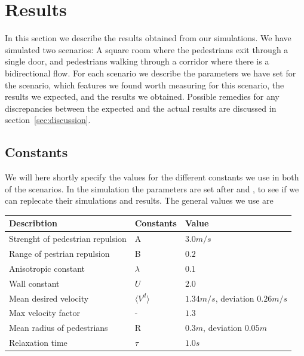 \section{Results}
\label{sec:results}
In this section we describe the results obtained from our simulations. We have simulated two scenarios: A square room where the pedestrians exit through a single door, and pedestrians walking through a corridor where there is a bidirectional flow. For each scenario we describe the parameters we have set for the scenario, which features we found worth measuring for this scenario, the results we expected, and the results we obtained. Possible remedies for any discrepancies between the expected and the actual results are discussed in section~\ref{sec:discussion}.

\subsection{Constants}
We will here shortly specify the values for the different constants we use in both of the scenarios.
In the simulation the parameters are set after \cite{ABconstant} and \cite{self-org}, to see if we can replecate their simulations and results.
The general values we use are

\begin{center}
\begin{table}[ht]
\begin{center}
    \begin{tabular}{ | l | l | l |}
    \hline
       Describtion & Constants & Value \\ \hline \hline
	Strenght of pedestrian repulsion & A & $3.0m/s$ \\ \hline	
	Range of pestrian repulsion & B & $0.2$ \\ \hline
	Anisotropic constant & $\lambda$ & $0.1$ \\ \hline
	Wall constant & $U$ &  $2.0$ \\ \hline
	Mean desired velocity &  $\langle V^d \rangle$ &  $1.34 m/s$, deviation $0.26 m/s$ \\ \hline
	Max velocity factor & - &  $1.3$ \\ \hline
	Mean radius of pedestrians & R & $0.3 m$, deviation $0.05 m$\\ \hline
	Relaxation time & $\tau$ & $1.0 s$\\ \hline
    \end{tabular}
\label{Table_constants}
\end{center}
\end{table}
\end{center}


